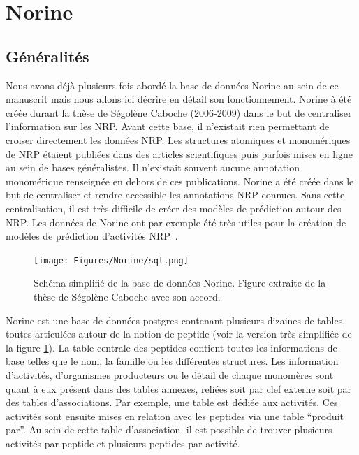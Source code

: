 \section{Norine}

\subsection{Généralités}

Nous avons déjà plusieurs fois abordé la base de données Norine au sein de ce manuscrit mais nous allons ici décrire en détail son fonctionnement.
Norine à été créée durant la thèse de Ségolène Caboche (2006-2009) dans le but de centraliser l'information sur les NRP.
Avant cette base, il n'existait rien permettant de croiser directement les données NRP.
Les structures atomiques et monomériques de NRP étaient publiées dans des articles scientifiques puis parfois mises en ligne au sein de bases généralistes.
Il n'existait souvent aucune annotation monomérique renseignée en dehors de ces publications.
Norine a été créée dans le but de centraliser et rendre accessible les annotations NRP connues.
Sans cette centralisation, il est très difficile de créer des modèles de prédiction autour des NRP.
Les données de Norine ont par exemple été très utiles pour la création de modèles de prédiction d'activités NRP~\cite{abdo_prediction_2014,abdo_new_2012}.

\begin{figure}[h!]
  \begin{center}
    \texttt{[image: Figures/Norine/sql.png]}
    \caption{\label{sql}Schéma simplifié de la base de données Norine.
    Figure extraite de la thèse de Ségolène Caboche avec son accord.}
  \end{center}
\end{figure}

Norine est une base de données postgres contenant plusieurs dizaines de tables, toutes articulées autour de la notion de peptide (voir la version très simplifiée de la figure \ref{sql}).
La table centrale des peptides contient toutes les informations de base telles que le nom, la famille ou les différentes structures.
Les information d'activités, d'organismes producteurs ou le détail de chaque monomères sont quant à eux présent dans des tables annexes, reliées soit par clef externe soit par des tables d'associations.
Par exemple, une table est dédiée aux activités.
Ces activités sont ensuite mises en relation avec les peptides via une table ``produit par''.
Au sein de cette table d'association, il est possible de trouver plusieurs activités par peptide et plusieurs peptides par activité.

